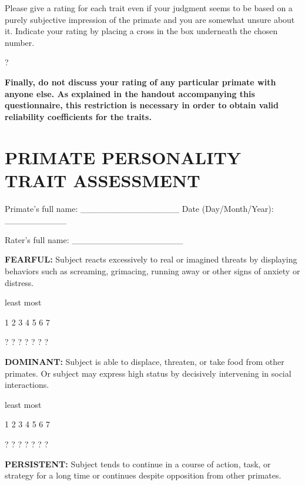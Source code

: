 \documentclass{article} %
\begin{document}
\noindent  

\noindent Please give a rating for each trait even if your judgment seems to be based on a purely subjective impression of the primate and you are somewhat unsure about it. Indicate your rating by placing a cross in the box underneath the chosen number.  

\noindent  

\noindent ? 

\noindent  

\noindent \textbf{Finally, do not discuss your rating of any particular primate with anyone else. As explained in the handout accompanying this questionnaire, this restriction is necessary in order to obtain valid reliability coefficients for the traits. }  

\noindent 
\section{PRIMATE PERSONALITY TRAIT ASSESSMENT }

\noindent Primate's full name: \_\_\_\_\_\_\_\_\_\_\_\_\_\_\_\_  Date (Day/Month/Year): \_\_\_\_\_\_\_\_\_\_ 

\noindent Rater's full name: \_\_\_\_\_\_\_\_\_\_\_\_\_\_\_\_\_\_ 

\noindent \textbf{FEARFUL:} Subject reacts excessively to real or imagined threats by displaying behaviors such as screaming, grimacing, running away or other signs of anxiety or distress. 

\noindent  

\noindent least                            most

  1    2    3    4    5    6    7   

  ?    ?    ?    ?    ?    ?    ?   

\noindent  

\noindent \textbf{DOMINANT:} Subject is able to displace, threaten, or take food from other primates. Or subject may express high status by decisively intervening in social interactions. 

\noindent  

\noindent least                            most

  1    2    3    4    5    6    7   

  ?    ?    ?    ?    ?    ?    ?   

\noindent  

\noindent \textbf{PERSISTENT:} Subject tends to continue in a course of action, task, or strategy for a long time or continues despite opposition from other primates. 
\end{document}
